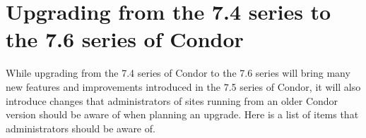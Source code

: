 \section{\label{sec:gotchas}Upgrading from the 7.4 series to the 7.6 series of Condor}

While upgrading from the 7.4 series of Condor to the 7.6 series will
bring many new features and improvements introduced in the 7.5 series of
Condor, it will also introduce changes that administrators of sites
running from an older Condor version should be aware of when
planning an upgrade.
Here is a list of items that administrators should be aware of.

